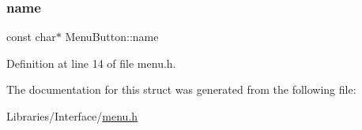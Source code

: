 \subsubsection{\texorpdfstring{name}{name}}
{\footnotesize\ttfamily const char$\ast$ Menu\+Button\+::name}



Definition at line 14 of file menu.\+h.



The documentation for this struct was generated from the following file\+:\begin{DoxyCompactItemize}
\item 
Libraries/\+Interface/\mbox{\hyperlink{menu_8h}{menu.\+h}}\end{DoxyCompactItemize}
